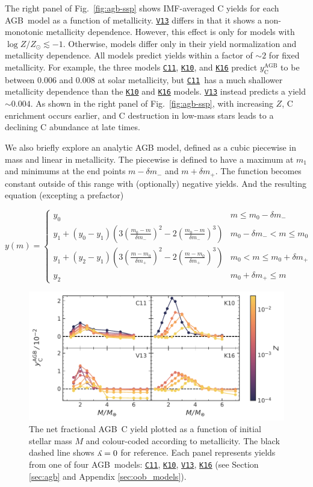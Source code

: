 \documentclass[fleqn,usenatbib]{mnras}
\newcommand{\cxi}{\texttt{\hyperlink{C11}{C11}}}
\newcommand{\kx}{\texttt{\hyperlink{K10}{K10}}}
\newcommand{\kxvi}{\texttt{\hyperlink{K16}{K16}}}
\newcommand{\vxiii}{\texttt{\hyperlink{V13}{V13}}}
\newcommand{\agb}{AGB}
\newcommand{\imf}{IMF}
\newcommand{\y}{\ensuremath{\rotatebox[origin=B,y=0.5ex]{180}{y}}}
\newcommand{\about}[1]{${\sim} #1$}
\begin{document}
The right panel of Fig.~\ref{fig:agb-ssp} shows \imf-averaged C yields for each \agb\ model as a function of metallicity.
\vxiii{} differs in that it shows a non-monotonic metallicity dependence. However, this effect is only for models with $\log Z/Z_\odot \lesssim -1$.
Otherwise, models differ only in their yield normalization and metallicity dependence. All models predict yields within a factor of \about{2} for fixed metallicity.
For example, the three models \cxi, \kx{}, and \kxvi{} predict $y_\text{C}^\text{AGB}$ to be between 0.006 and 0.008 at solar metallicity, but \cxi\ has a much shallower metallicity dependence than the \kx{} and \kxvi{} models. \vxiii{} instead predicts a yield \about{0.004}.
    As shown in the right panel of Fig.~\ref{fig:agb-ssp}, with increasing $Z$, C enrichment occurs earlier, and C destruction in low-mass stars leads to a declining C abundance at late times.


We also briefly explore an analytic AGB model, defined as a cubic piecewise in mass and linear in metallicity.
The piecewise is defined to have a maximum at $m_1$ and minimums at
the end points $m-\delta m_-$ and $m+\delta m_+$. The function becomes constant
outside of this range with (optionally) negative yields.
And the resulting equation (excepting a prefactor)

\begin{equation}
y(m) = 
\begin{cases}
y_0 & m \leq m_0 - \delta m_- \\
y_1 + (y_0 - y_1) \left(3 (\frac{m_0 - m}{\delta m_-})^2 - 
2 (\frac{m_0 - m}{\delta m_-})^3\right) 
    & m_0 - \delta m_- < m \leq m_0 \\
y_1 + (y_2 - y_1) \left(3 (\frac{m - m_0}{\delta m_+})^2 - 
2 (\frac{m-m_0}{\delta m_+})^3\right) 
    & m_0 < m \leq m_0 + \delta m_+ \\
y_2 & m_0 + \delta m_+ \leq m
\end{cases}
\end{equation}


\begin{figure}
    \centering
 	    \includegraphics[scale=1]{agb_yields.pdf}
        \caption[]{The net fractional \agb\ C yield  plotted as a function of initial stellar mass $M$ and colour-coded according to metallicity. The black dashed line shows $\y=0$ for reference. Each panel represents yields from one of four \agb\ models: \cxi, \kx{}, \vxiii{}, \kxvi{} (see Section \ref{sec:agb} and  Appendix \ref{sec:oob_models}). }
        \label{fig:y_agb}
\end{figure}
\end{document}
